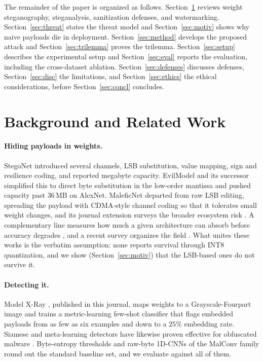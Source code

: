 \documentclass[a4paper,fleqn]{cas-dc}
\theoremstyle{plain}
\theoremstyle{remark}
\begin{document}
The remainder of the paper is organized as follows. Section~\ref{sec:related} reviews
weight steganography, steganalysis, sanitization defenses, and watermarking.
Section~\ref{sec:threat} states the threat model and Section~\ref{sec:motiv} shows why
naive payloads die in deployment. Section~\ref{sec:method} develops the proposed attack
and Section~\ref{sec:trilemma} proves the trilemma. Section~\ref{sec:setup} describes
the experimental setup and Section~\ref{sec:eval} reports the evaluation, including the
cross-dataset ablation. Section~\ref{sec:defenses} discusses defenses,
Section~\ref{sec:disc} the limitations, and Section~\ref{sec:ethics} the ethical
considerations, before Section~\ref{sec:concl} concludes.

\section{Background and Related Work}\label{sec:related}
\paragraph{Hiding payloads in weights.} StegoNet \citep{liu2020stegonet} introduced
several channels, LSB substitution, value mapping, sign and resilience coding,
and reported megabyte capacity. EvilModel \citep{wang2021evilmodel} and its successor
\citep{wang2022evilmodel2} simplified this to direct byte substitution in the
low-order mantissa and pushed capacity past $36$\,MB on AlexNet. MaleficNet
\citep{hitaj2022maleficnet} departed from raw LSB editing, spreading the payload with
CDMA-style channel coding so that it tolerates small weight changes, and its journal
extension surveys the broader ecosystem risk \citep{hitaj2025trust}. A complementary
line measures how much a given architecture can absorb before accuracy degrades
\citep{agrawal2023stegcapacity,zhang2023stegcapacity}, and a recent survey organizes
the field \citep{chaganti2021stegomalware}. What unites these works is the verbatim
assumption: none reports survival through INT8 quantization, and we show
(Section~\ref{sec:motiv}) that the LSB-based ones do not survive it.

\paragraph{Detecting it.} Model X-Ray \citep{gilkarov2026modelxray}, published in this
journal, maps weights to a Grayscale-Fourpart image and trains a metric-learning
few-shot classifier \citep{snell2017prototypical,vinyals2016matching} that flags
embedded payloads from as few as six examples and down to a $25\%$ embedding rate.
Siamese and meta-learning detectors have likewise proven effective for obfuscated
malware \citep{zhu2023taskaware}. Byte-entropy thresholds and raw-byte 1D-CNNs of the
MalConv family round out the standard baseline set, and we evaluate against all of
them.
\end{document}
